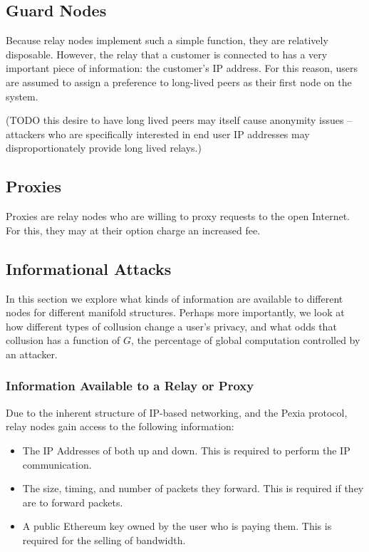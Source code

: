 \documentclass{article}
\newcommand{\mesh}{Pexia}
\begin{document}
\subsection{Guard Nodes}

Because relay nodes implement such a simple function, they are relatively disposable. However, the relay that a customer is connected to has a very important piece of information: the customer’s IP address. For this reason, users are assumed to assign a preference to long-lived peers as their first node on the system.

(TODO this desire to have long lived peers may itself cause anonymity issues – attackers who are specifically interested in end user IP addresses may disproportionately provide long lived relays.)

\subsection{Proxies}

Proxies are relay nodes who are willing to proxy requests to the open Internet. For this, they may at their option charge an increased fee.

\subsection{Informational Attacks}

In this section we explore what kinds of information are available to different nodes for different manifold structures. Perhaps more importantly, we look at how different types of collusion change a user's privacy, and what odds that collusion has a function of $G$, the percentage of global computation controlled by an attacker.

\subsubsection{Information Available to a Relay or Proxy}

Due to the inherent structure of IP-based networking, and the \mesh{} protocol, relay nodes gain access to the following information:

\begin{itemize}
    \item The IP Addresses of both up and down. This is required to perform the IP communication.
    \item The size, timing, and number of packets they forward. This is required if they are to forward packets.
    \item A public Ethereum key owned by the user who is paying them. This is required for the selling of bandwidth.
\end{itemize}
\end{document}
